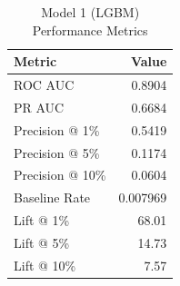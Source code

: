 \begin{table}[h]
\centering
\begin{tabular}{lr}
\toprule
Metric & Value \\
\midrule
ROC AUC & 0.8904 \\
PR AUC & 0.6684 \\
Precision @ 1\% & 0.5419 \\
Precision @ 5\% & 0.1174 \\
Precision @ 10\% & 0.0604 \\
Baseline Rate & 0.007969 \\
Lift @ 1\% & 68.01 \\
Lift @ 5\% & 14.73 \\
Lift @ 10\% & 7.57 \\
\bottomrule
\end{tabular}
\caption{Model 1 (LGBM) Performance Metrics}
\label{tab:model1_lgbm_metrics}
\end{table}
